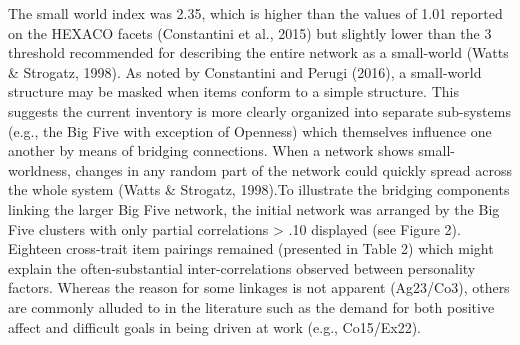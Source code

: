 \documentclass[english,man]{apa6}
\theoremstyle{definition}
\theoremstyle{definition}
\theoremstyle{remark}
\begin{document}
The small world index was 2.35, which is higher than the values of 1.01
reported on the HEXACO facets (Constantini et al., 2015) but slightly
lower than the 3 threshold recommended for describing the entire network
as a small-world (Watts \& Strogatz, 1998). As noted by Constantini and
Perugi (2016), a small-world structure may be masked when items conform
to a simple structure. This suggests the current inventory is more
clearly organized into separate sub-systems (e.g., the Big Five with
exception of Openness) which themselves influence one another by means
of bridging connections. When a network shows small-worldness, changes
in any random part of the network could quickly spread across the whole
system (Watts \& Strogatz, 1998).To illustrate the bridging components
linking the larger Big Five network, the initial network was arranged by
the Big Five clusters with only partial correlations \textgreater{} .10
displayed (see Figure 2). Eighteen cross-trait item pairings remained
(presented in Table 2) which might explain the often-substantial
inter-correlations observed between personality factors. Whereas the
reason for some linkages is not apparent (Ag23/Co3), others are commonly
alluded to in the literature such as the demand for both positive affect
and difficult goals in being driven at work (e.g., Co15/Ex22).
\end{document}
